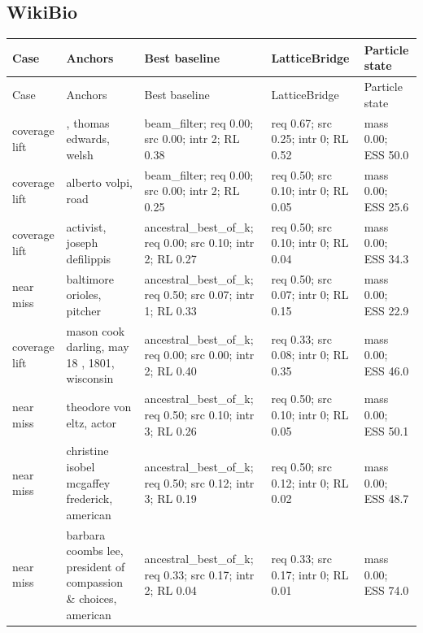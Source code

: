 \subsection*{WikiBio}
\begin{longtable}{>{\raggedright\arraybackslash}p{}>{\raggedright\arraybackslash}p{}>{\raggedright\arraybackslash}p{}>{\raggedright\arraybackslash}p{}>{\raggedright\arraybackslash}p{}}
\toprule
Case & Anchors & Best baseline & LatticeBridge & Particle state \\
\midrule
\endfirsthead
\toprule
Case & Anchors & Best baseline & LatticeBridge & Particle state \\
\midrule
\endhead
coverage lift & 1779, thomas edwards, welsh & beam\_filter; req 0.00; src 0.00; intr 2; RL 0.38 & req 0.67; src 0.25; intr 0; RL 0.52 & mass 0.00; ESS 50.0 \\
\midrule
coverage lift & alberto volpi, road & beam\_filter; req 0.00; src 0.00; intr 2; RL 0.25 & req 0.50; src 0.10; intr 0; RL 0.05 & mass 0.00; ESS 25.6 \\
\midrule
coverage lift & activist, joseph defilippis & ancestral\_best\_of\_k; req 0.00; src 0.10; intr 2; RL 0.27 & req 0.50; src 0.10; intr 0; RL 0.04 & mass 0.00; ESS 34.3 \\
\midrule
near miss & baltimore orioles, pitcher & ancestral\_best\_of\_k; req 0.50; src 0.07; intr 1; RL 0.33 & req 0.50; src 0.07; intr 0; RL 0.15 & mass 0.00; ESS 22.9 \\
\midrule
coverage lift & mason cook darling, may 18 , 1801, wisconsin & ancestral\_best\_of\_k; req 0.00; src 0.00; intr 2; RL 0.40 & req 0.33; src 0.08; intr 0; RL 0.35 & mass 0.00; ESS 46.0 \\
\midrule
near miss & theodore von eltz, actor & ancestral\_best\_of\_k; req 0.50; src 0.10; intr 3; RL 0.26 & req 0.50; src 0.10; intr 0; RL 0.05 & mass 0.00; ESS 50.1 \\
\midrule
near miss & christine isobel mcgaffey frederick, american & ancestral\_best\_of\_k; req 0.50; src 0.12; intr 3; RL 0.19 & req 0.50; src 0.12; intr 0; RL 0.02 & mass 0.00; ESS 48.7 \\
\midrule
near miss & barbara coombs lee, president of compassion \& choices, american & ancestral\_best\_of\_k; req 0.33; src 0.17; intr 2; RL 0.04 & req 0.33; src 0.17; intr 0; RL 0.01 & mass 0.00; ESS 74.0 \\
\midrule
\bottomrule
\end{longtable}
\endgroup
